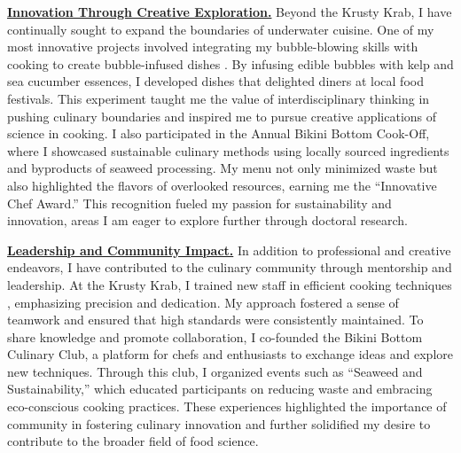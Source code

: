 \textbf{\underline{Innovation Through Creative Exploration.}}
Beyond the Krusty Krab, I have continually sought to expand the boundaries of underwater cuisine. One of my most innovative projects involved integrating my bubble-blowing skills with cooking to create bubble-infused dishes \cite{ref2}. By infusing edible bubbles with kelp and sea cucumber essences, I developed dishes that delighted diners at local food festivals. This experiment taught me the value of interdisciplinary thinking in pushing culinary boundaries and inspired me to pursue creative applications of science in cooking.
I also participated in the Annual Bikini Bottom Cook-Off, where I showcased sustainable culinary methods using locally sourced ingredients and byproducts of seaweed processing. My menu not only minimized waste but also highlighted the flavors of overlooked resources, earning me the ``Innovative Chef Award.'' This recognition fueled my passion for sustainability and innovation, areas I am eager to explore further through doctoral research. \\ \vspace{-4pt}

\textbf{\underline{Leadership and Community Impact.}}
In addition to professional and creative endeavors, I have contributed to the culinary community through mentorship and leadership. At the Krusty Krab, I trained new staff in efficient cooking techniques \cite{ref3, ref4}, emphasizing precision and dedication. My approach fostered a sense of teamwork and ensured that high standards were consistently maintained.
To share knowledge and promote collaboration, I co-founded the Bikini Bottom Culinary Club, a platform for chefs and enthusiasts to exchange ideas and explore new techniques. Through this club, I organized events such as ``Seaweed and Sustainability,'' which educated participants on reducing waste and embracing eco-conscious cooking practices. These experiences highlighted the importance of community in fostering culinary innovation and further solidified my desire to contribute to the broader field of food science. \\ \vspace{-4pt}

